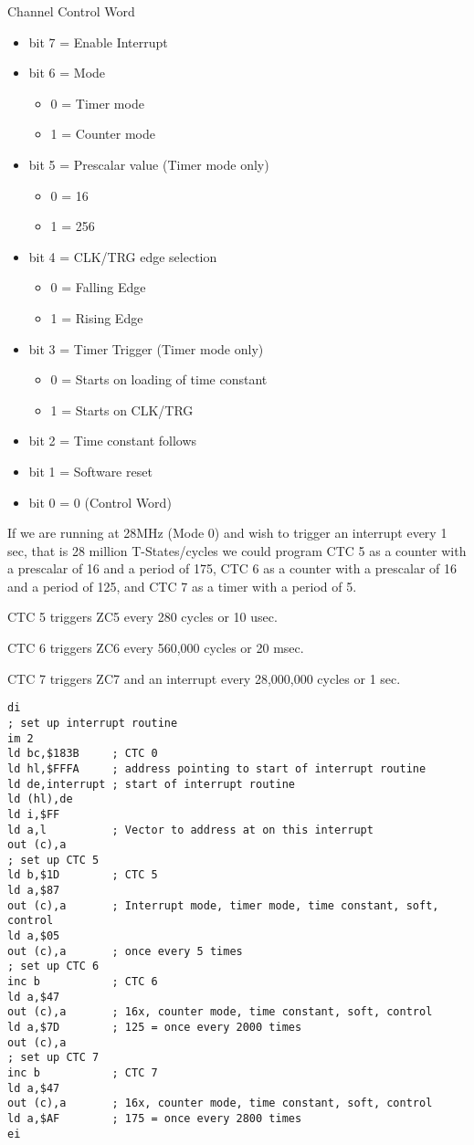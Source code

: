 Channel Control Word
\begin{itemize}
\item[] bit 7 = Enable Interrupt
\item[] bit 6 = Mode
  \begin{itemize}
  \item 0 = Timer mode
  \item 1 = Counter mode
  \end{itemize}
\item[] bit 5 = Prescalar value (Timer mode only)
  \begin{itemize}
  \item 0 = 16
  \item 1 = 256
  \end{itemize}
\item[] bit 4 = CLK/TRG edge selection
  \begin{itemize}
  \item 0 = Falling Edge
  \item 1 = Rising Edge
  \end{itemize}
\item[] bit 3 = Timer Trigger (Timer mode only)
  \begin{itemize}
  \item 0 = Starts on loading of time constant
  \item 1 = Starts on CLK/TRG
  \end{itemize}
\item[] bit 2 = Time constant follows
\item[] bit 1 = Software reset
\item[] bit 0 = 0 (Control Word)
\end{itemize}

If we are running at 28MHz (Mode 0) and wish to trigger an interrupt
every 1 sec, that is 28 million T-States/cycles we could program CTC 5
as a counter with a prescalar of 16 and a period of 175, CTC 6 as a
counter with a prescalar of 16 and a period of 125, and CTC 7 as a
timer with a period of 5.

CTC 5 triggers ZC5 every 280 cycles or 10 usec.

CTC 6 triggers ZC6 every 560,000 cycles or 20 msec.

CTC 7 triggers ZC7 and an interrupt every 28,000,000 cycles or 1 sec.

\begin{verbatim}
di
; set up interrupt routine
im 2
ld bc,$183B     ; CTC 0
ld hl,$FFFA     ; address pointing to start of interrupt routine
ld de,interrupt ; start of interrupt routine
ld (hl),de
ld i,$FF
ld a,l          ; Vector to address at on this interrupt
out (c),a
; set up CTC 5
ld b,$1D        ; CTC 5
ld a,$87
out (c),a       ; Interrupt mode, timer mode, time constant, soft, control
ld a,$05
out (c),a       ; once every 5 times 
; set up CTC 6
inc b           ; CTC 6
ld a,$47
out (c),a       ; 16x, counter mode, time constant, soft, control
ld a,$7D        ; 125 = once every 2000 times
out (c),a
; set up CTC 7
inc b           ; CTC 7
ld a,$47
out (c),a       ; 16x, counter mode, time constant, soft, control
ld a,$AF        ; 175 = once every 2800 times
ei
\end{verbatim}
  
